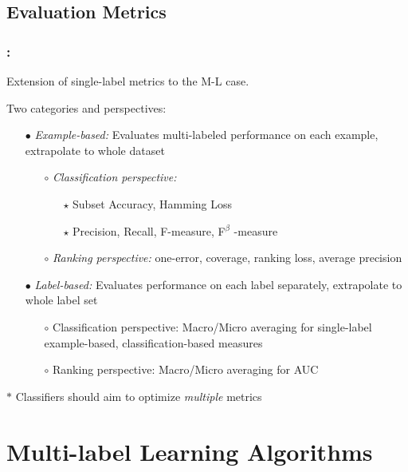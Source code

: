 \documentclass{beamer}
\begin{document}
\subsection{Evaluation Metrics}
\begin{frame}
\frametitle{\insertsection : \insertsubsection}
Extension of single-label metrics to the M-L case.

Two categories and perspectives:
\begin{itemize}
\item[$\bullet$] \emph{Example-based: }Evaluates multi-labeled performance on each example, extrapolate to whole dataset
\begin{itemize}
\item[$\circ$] \emph{Classification perspective:}
\begin{itemize}
\item[$\star$] Subset Accuracy, Hamming Loss
\item[$\star$] Precision, Recall, F-measure, F$^\beta$ -measure
\end{itemize}
\item[$\circ$] \emph{Ranking perspective:} one-error, coverage, ranking loss, average precision
\end{itemize}
\item[$\bullet$] \emph{Label-based: }Evaluates performance on each label separately, extrapolate to whole label set
\begin{itemize}
\item[$\circ$] Classification perspective: Macro/Micro averaging for single-label example-based, classification-based measures
\item[$\circ$] Ranking perspective: Macro/Micro averaging for AUC
\end{itemize}
\end{itemize}
$\ast$ Classifiers should aim to optimize \emph{multiple} metrics
\end{frame}
\section{Multi-label Learning Algorithms}
\end{document}
